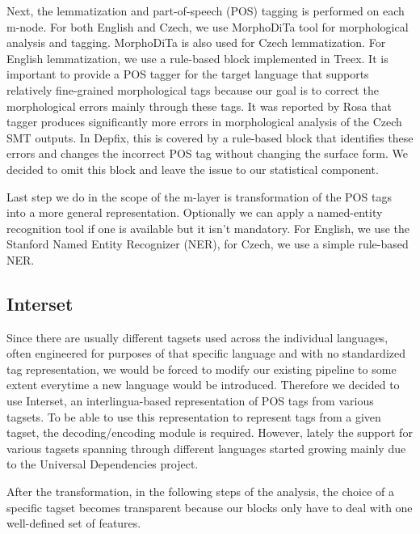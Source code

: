 Next, the lemmatization and part-of-speech (POS) tagging is performed on each m-node.
For both English and Czech, we use MorphoDiTa\cite{strakova14:morphodita}
tool for morphological analysis and tagging. MorphoDiTa is also used for Czech lemmatization.
For English lemmatization, we use a rule-based block implemented in Treex.
It is important to provide a POS tagger for the target language that supports
relatively fine-grained morphological tags because our goal is to correct the morphological
errors mainly through these tags.
It was reported by Rosa that tagger produces significantly more
errors in morphological analysis of the Czech SMT outputs. In Depfix, this is covered
by a rule-based block that identifies these errors and changes the incorrect POS tag without
changing the surface form. We decided to omit this block and leave the issue to our statistical
component.



Last step we do in the scope of the m-layer is transformation of the POS tags into
a more general representation. Optionally we can apply a named-entity recognition
tool if one is available but it isn't mandatory. For English, we use the Stanford
Named Entity Recognizer (NER)\cite{Finkel:2005:INI:1219840.1219885},
for Czech, we use a simple rule-based NER. 

\subsection{Interset}

Since there are usually different tagsets used across the individual languages,
often engineered for purposes of that specific language and with no standardized
tag representation,
we would be forced to modify our existing pipeline to some extent everytime
a new language would be introduced.
Therefore we decided to use Interset\cite{biblio:ZeReusableTagset2008}, an interlingua-based
representation of POS tags from various tagsets. To be able to use this
representation to represent tags from a given tagset, the decoding/encoding
module is required. However, lately the support for various tagsets spanning
through different languages started growing mainly due to the Universal Dependencies project.

After the transformation, in the following steps of the analysis, the choice
of a specific tagset becomes transparent because our blocks only
have to deal with one well-defined set of features.


